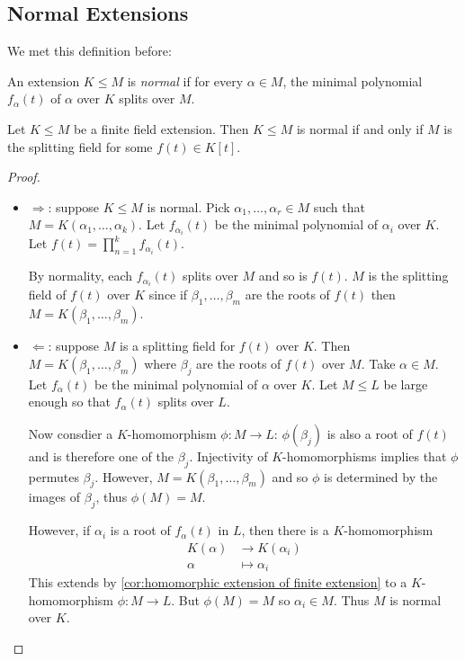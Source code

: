 \documentclass[a4paper]{article}
\begin{document}
\subsection{Normal Extensions}

We met this definition before:


\begin{definition}
  An extension \(K \leq M\) is \emph{normal} if for every \(\alpha \in M\), the minimal polynomial \(f_\alpha(t)\) of \(\alpha\) over \(K\) splits over \(M\).
\end{definition}

\begin{theorem}
  Let \(K \leq M\) be a finite field extension. Then \(K \leq M\) is normal if and only if \(M\) is the splitting field for some \(f(t) \in K[t]\).
\end{theorem}

\begin{proof}\leavevmode
  \begin{itemize}
  \item \(\Rightarrow\): suppose \(K \leq M\) is normal. Pick \(\alpha_1, \dots, \alpha_r \in M\) such that \(M = K(\alpha_1, \dots, \alpha_k)\). Let \(f_{\alpha_i}(t)\) be the minimal polynomial of \(\alpha_i\) over \(K\). Let \(f(t) = \prod_{n = 1}^{k} f_{\alpha_i}(t)\).

    By normality, each \(f_{\alpha_i}(t)\) splits over \(M\) and so is \(f(t)\). \(M\) is the splitting field of \(f(t)\) over \(K\) since if \(\beta_1, \dots, \beta_m\) are the roots of \(f(t)\) then \(M = K(\beta_1, \dots, \beta_m)\).
  \item \(\Leftarrow\): suppose \(M\) is a splitting field for \(f(t)\) over \(K\). Then \(M = K(\beta_1, \dots, \beta_m)\) where \(\beta_j\) are the roots of \(f(t)\) over \(M\). Take \(\alpha \in M\). Let \(f_\alpha(t)\) be the minimal polynomial of \(\alpha\) over \(K\). Let \(M \leq L\) be large enough so that \(f_\alpha(t)\) splits over \(L\).

    Now consdier a \(K\)-homomorphism \(\phi: M \to L\): \(\phi(\beta_j)\) is also a root of \(f(t)\) and is therefore one of the \(\beta_j\). Injectivity of \(K\)-homomorphisms implies that \(\phi\) permutes \(\beta_j\). However, \(M = K(\beta_1, \dots, \beta_m)\) and so \(\phi\) is determined by the images of \(\beta_j\), thus \(\phi(M) = M\).

    However, if \(\alpha_i\) is a root of \(f_\alpha(t)\) in \(L\), then there is a \(K\)-homomorphism
    \begin{align*}
      K(\alpha) &\to K(\alpha_i) \\
      \alpha &\mapsto \alpha_i
    \end{align*}
    This extends by \ref{cor:homomorphic extension of finite extension} to a \(K\)-homomorphism \(\phi: M \to L\). But \(\phi(M) = M\) so \(\alpha_i \in M\). Thus \(M\) is normal over \(K\).
  \end{itemize}
\end{proof}
\end{document}
